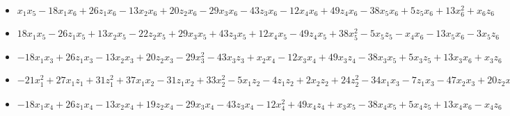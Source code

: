 \documentclass[11pt, english]{article}
\begin{document}
\begin{itemize}
\item ${x}_{1}
       {x}_{5}-18 {x}_{1} {x}_{6}+26 {z}_{1} {x}_{6}-13 {x}_{2}
       {x}_{6}+20 {z}_{2} {x}_{6}-29 {x}_{3} {x}_{6}-43 {z}_{3}
       {x}_{6}-12 {x}_{4} {x}_{6}+49 {z}_{4} {x}_{6}-38 {x}_{5} {x}_{6}+5
       {z}_{5} {x}_{6}+13 {x}_{6}^{2}+{x}_{6} {z}_{6}$


\item $18 {x}_{1}
       {x}_{5}-26 {z}_{1} {x}_{5}+13 {x}_{2} {x}_{5}-22 {z}_{2}
       {x}_{5}+29 {x}_{3} {x}_{5}+43 {z}_{3} {x}_{5}+12 {x}_{4}
       {x}_{5}-49 {z}_{4} {x}_{5}+38 {x}_{5}^{2}-5 {x}_{5}
       {z}_{5}-{x}_{4} {x}_{6}-13 {x}_{5} {x}_{6}-3 {x}_{5} {z}_{6}$


\item $-18
       {x}_{1} {x}_{3}+26 {z}_{1} {x}_{3}-13 {x}_{2} {x}_{3}+20 {z}_{2}
       {x}_{3}-29 {x}_{3}^{2}-43 {x}_{3} {z}_{3}+{x}_{2} {x}_{4}-12
       {x}_{3} {x}_{4}+49 {x}_{3} {z}_{4}-38 {x}_{3} {x}_{5}+5 {x}_{3}
       {z}_{5}+13 {x}_{3} {x}_{6}+{x}_{3} {z}_{6}$


\item $-21 {x}_{1}^{2}+27
       {x}_{1} {z}_{1}+31 {z}_{1}^{2}+37 {x}_{1} {x}_{2}-31 {z}_{1}
       {x}_{2}+33 {x}_{2}^{2}-5 {x}_{1} {z}_{2}-4 {z}_{1} {z}_{2}+2
       {x}_{2} {z}_{2}+24 {z}_{2}^{2}-34 {x}_{1} {x}_{3}-7 {z}_{1}
       {x}_{3}-47 {x}_{2} {x}_{3}+20 {z}_{2} {x}_{3}-33 {x}_{3}^{2}-33
       {x}_{1} {z}_{3}+14 {z}_{1} {z}_{3}-7 {x}_{2} {z}_{3}-40 {z}_{2}
       {z}_{3}+31 {x}_{3} {z}_{3}-31 {z}_{3}^{2}-28 {x}_{1} {x}_{4}+18
       {z}_{1} {x}_{4}-9 {x}_{2} {x}_{4}-37 {z}_{2} {x}_{4}+11 {x}_{3}
       {x}_{4}-22 {z}_{3} {x}_{4}-43 {x}_{4}^{2}+47 {x}_{1} {z}_{4}-23
       {z}_{1} {z}_{4}-39 {x}_{2} {z}_{4}+8 {z}_{2} {z}_{4}+14 {x}_{3}
       {z}_{4}-28 {z}_{3} {z}_{4}-36 {x}_{4} {z}_{4}+23 {z}_{4}^{2}+46
       {x}_{1} {x}_{5}-44 {z}_{1} {x}_{5}+23 {x}_{2} {x}_{5}-33 {z}_{2}
       {x}_{5}+18 {x}_{3} {x}_{5}-36 {z}_{3} {x}_{5}-3 {x}_{4} {x}_{5}-13
       {z}_{4} {x}_{5}-30 {x}_{5}^{2}-22 {x}_{1} {z}_{5}+43 {z}_{1}
       {z}_{5}+29 {x}_{2} {z}_{5}+7 {z}_{2} {z}_{5}-13 {x}_{3} {z}_{5}+26
       {z}_{3} {z}_{5}+19 {x}_{4} {z}_{5}+15 {z}_{4} {z}_{5}-24 {x}_{5}
       {z}_{5}-25 {z}_{5}^{2}-37 {x}_{1} {x}_{6}+31 {z}_{1} {x}_{6}+35
       {x}_{2} {x}_{6}-2 {z}_{2} {x}_{6}+47 {x}_{3} {x}_{6}+7 {z}_{3}
       {x}_{6}+9 {x}_{4} {x}_{6}+39 {z}_{4} {x}_{6}-22 {x}_{5} {x}_{6}-29
       {z}_{5} {x}_{6}+33 {x}_{6}^{2}+{z}_{2} {z}_{6}+{z}_{6}^{2}$

\item $-18{x}_{1} {x}_{4}+26 {z}_{1} {x}_{4}-13 {x}_{2} {x}_{4}+19 {z}_{2}
       {x}_{4}-29 {x}_{3} {x}_{4}-43 {z}_{3} {x}_{4}-12 {x}_{4}^{2}+49
       {x}_{4} {z}_{4}+{x}_{3} {x}_{5}-38 {x}_{4} {x}_{5}+5 {x}_{4}
       {z}_{5}+13 {x}_{4} {x}_{6}-{x}_{4} {z}_{6}$

\end{itemize}
\end{document}
